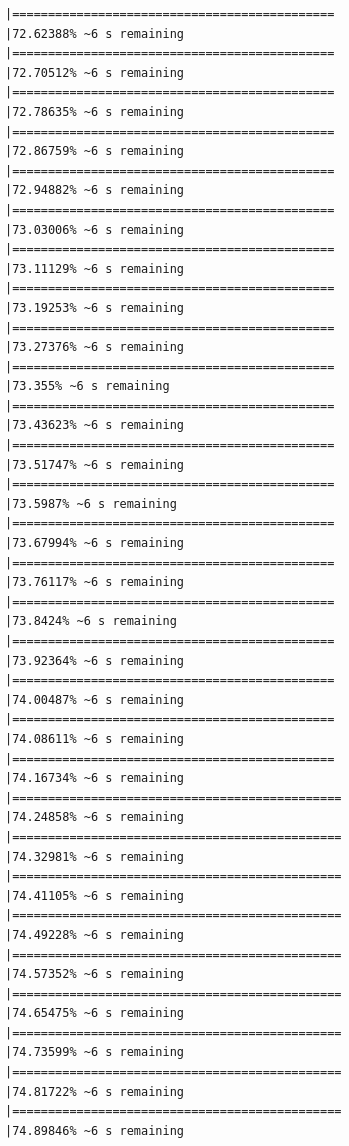 \documentclass{article}\usepackage[]{graphicx}\usepackage[]{xcolor}
\makeatletter
\newenvironment{kframe}{%
 \def\at@end@of@kframe{}%
 \ifinner\ifhmode%
  \def\at@end@of@kframe{\end{minipage}}%
  \begin{minipage}{\columnwidth}%
 \fi\fi%
 \def\FrameCommand##1{\hskip\@totalleftmargin \hskip-\fboxsep
 \colorbox{shadecolor}{##1}\hskip-\fboxsep
     \hskip-\linewidth \hskip-\@totalleftmargin \hskip\columnwidth}%
 \MakeFramed {\advance\hsize-\width
   \@totalleftmargin\z@ \linewidth\hsize
   \@setminipage}}%
 {\par\unskip\endMakeFramed%
 \at@end@of@kframe}
\newenvironment{knitrout}{}{} %
\makeatother
\begin{document}
\begin{knitrout}
\begin{kframe}
\begin{verbatim}
|=============================================                 |72.62388% ~6 s remaining  
|=============================================                 |72.70512% ~6 s remaining  
|=============================================                 |72.78635% ~6 s remaining  
|=============================================                 |72.86759% ~6 s remaining  
|=============================================                 |72.94882% ~6 s remaining  
|=============================================                 |73.03006% ~6 s remaining  
|=============================================                 |73.11129% ~6 s remaining  
|=============================================                 |73.19253% ~6 s remaining  
|=============================================                 |73.27376% ~6 s remaining  
|=============================================                 |73.355% ~6 s remaining    
|=============================================                 |73.43623% ~6 s remaining  
|=============================================                 |73.51747% ~6 s remaining  
|=============================================                 |73.5987% ~6 s remaining   
|=============================================                 |73.67994% ~6 s remaining  
|=============================================                 |73.76117% ~6 s remaining  
|=============================================                 |73.8424% ~6 s remaining   
|=============================================                 |73.92364% ~6 s remaining  
|=============================================                 |74.00487% ~6 s remaining  
|=============================================                 |74.08611% ~6 s remaining  
|=============================================                 |74.16734% ~6 s remaining  
|==============================================                |74.24858% ~6 s remaining  
|==============================================                |74.32981% ~6 s remaining  
|==============================================                |74.41105% ~6 s remaining  
|==============================================                |74.49228% ~6 s remaining  
|==============================================                |74.57352% ~6 s remaining  
|==============================================                |74.65475% ~6 s remaining  
|==============================================                |74.73599% ~6 s remaining  
|==============================================                |74.81722% ~6 s remaining  
|==============================================                |74.89846% ~6 s remaining  

\end{verbatim}
\end{kframe}
\end{knitrout}
\end{document}
